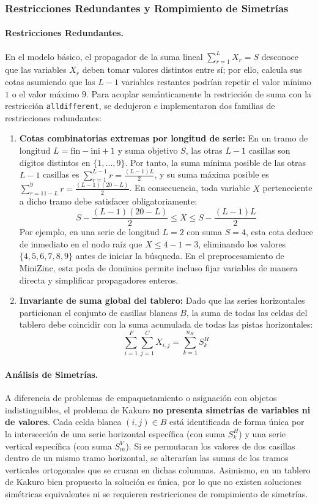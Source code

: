 \subsubsection{Restricciones Redundantes y Rompimiento de Simetrías}
\paragraph{Restricciones Redundantes.}
En el modelo básico, el propagador de la suma lineal $\sum_{r=1}^L X_r = S$ desconoce que las variables $X_r$ deben tomar valores distintos entre sí; por ello, calcula sus cotas asumiendo que las $L-1$ variables restantes podrían repetir el valor mínimo $1$ o el valor máximo $9$. Para acoplar semánticamente la restricción de suma con la restricción \texttt{alldifferent}, se dedujeron e implementaron dos familias de restricciones redundantes:
\begin{enumerate}
    \item \textbf{Cotas combinatorias extremas por longitud de serie:} En un tramo de longitud $L = \text{fin} - \text{ini} + 1$ y suma objetivo $S$, las otras $L - 1$ casillas son dígitos distintos en $\{1, \dots, 9\}$. Por tanto, la suma mínima posible de las otras $L - 1$ casillas es $\sum_{r=1}^{L-1} r = \frac{(L-1)L}{2}$, y su suma máxima posible es $\sum_{r=11-L}^{9} r = \frac{(L-1)(20-L)}{2}$. En consecuencia, toda variable $X$ perteneciente a dicho tramo debe satisfacer obligatoriamente:
    \[
        S - \frac{(L-1)(20-L)}{2} \le X \le S - \frac{(L-1)L}{2}
    \]
    Por ejemplo, en una serie de longitud $L = 2$ con suma $S = 4$, esta cota deduce de inmediato en el nodo raíz que $X \le 4 - 1 = 3$, eliminando los valores $\{4, 5, 6, 7, 8, 9\}$ antes de iniciar la búsqueda. En el preprocesamiento de MiniZinc, esta poda de dominios permite incluso fijar variables de manera directa y simplificar propagadores enteros.
    \item \textbf{Invariante de suma global del tablero:} Dado que las series horizontales particionan el conjunto de casillas blancas $B$, la suma de todas las celdas del tablero debe coincidir con la suma acumulada de todas las pistas horizontales:
    \[
        \sum_{i=1}^{F} \sum_{j=1}^{C} X_{i,j} = \sum_{k=1}^{n_H} S^H_k
    \]
\end{enumerate}

\paragraph{Análisis de Simetrías.}
A diferencia de problemas de empaquetamiento o asignación con objetos indistinguibles, el problema de Kakuro \textbf{no presenta simetrías de variables ni de valores}. Cada celda blanca $(i, j) \in B$ está identificada de forma única por la intersección de una serie horizontal específica (con suma $S^H_k$) y una serie vertical específica (con suma $S^V_m$). Si se permutaran los valores de dos casillas dentro de un mismo tramo horizontal, se alterarían las sumas de los tramos verticales ortogonales que se cruzan en dichas columnas. Asimismo, en un tablero de Kakuro bien propuesto la solución es única, por lo que no existen soluciones simétricas equivalentes ni se requieren restricciones de rompimiento de simetrías.

